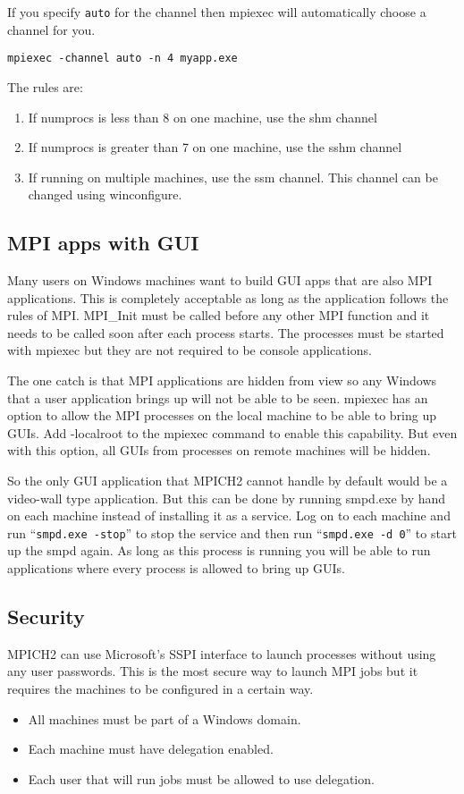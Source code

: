 \documentclass[dvipdfm,11pt]{article}
\begin{document}
If you specify \texttt{auto} for the channel then mpiexec will automatically choose a
channel for you.
\begin{verbatim}
mpiexec -channel auto -n 4 myapp.exe
\end{verbatim}
The rules are:
\begin{enumerate}
\item If numprocs is less than 8 on one machine, use the shm channel
\item If numprocs is greater than 7 on one machine, use the sshm channel
\item If running on multiple machines, use the ssm channel.  This channel can be changed 
using winconfigure.
\end{enumerate}

\subsection{MPI apps with GUI}
Many users on Windows machines want to build GUI apps that are also MPI applications.  This is
completely acceptable as long as the application follows the rules of MPI.  MPI\_Init must be
called before any other MPI function and it needs to be called soon after each process starts.
The processes must be started with mpiexec but they are not required to be console applications.

The one catch is that MPI applications are hidden from view so any Windows that a user 
application brings up will not be able to be seen.  mpiexec has an option to allow the MPI 
processes on the local machine to be able to bring up GUIs.  Add -localroot to the mpiexec
command to enable this capability.  But even with this option, all GUIs from processes on 
remote machines will be hidden.

So the only GUI application that MPICH2 cannot handle by default would be a video-wall type
application.  But this can be done by running smpd.exe by hand on each machine instead of
installing it as a service.  Log on to each machine and run ``\texttt{smpd.exe -stop}'' 
to stop the service and then run ``\texttt{smpd.exe -d 0}'' to start up the smpd again.  
As long as this process is running you will be able to run applications where every process 
is allowed to bring up GUIs.

\subsection{Security}
MPICH2 can use Microsoft's SSPI interface to launch processes without using any user 
passwords.  This is the most secure way to launch MPI jobs but it requires the machines to be 
configured in a certain way.
\begin{itemize}
\item All machines must be part of a Windows domain.
\item Each machine must have delegation enabled.
\item Each user that will run jobs must be allowed to use delegation.
\end{itemize}
\end{document}

